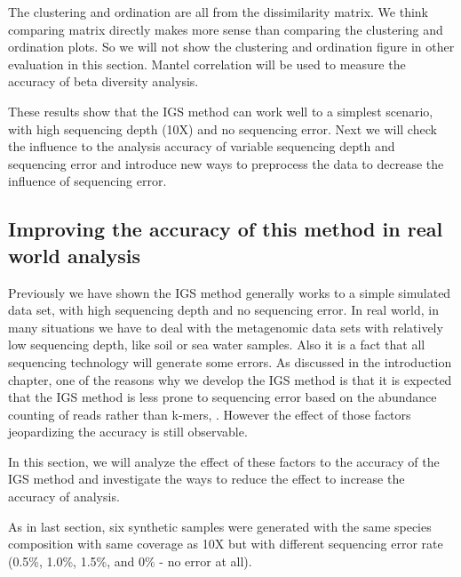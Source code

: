 The clustering and ordination are all from the dissimilarity matrix. 
We think comparing matrix directly makes more sense than comparing the 
clustering and ordination plots. So we will not show the clustering and 
ordination figure in other evaluation in this section. Mantel correlation will 
be used to measure the accuracy of beta diversity analysis.


These results show that the IGS method can work well to a simplest 
scenario, with high sequencing depth (10X) and no sequencing error. Next 
we will check the influence to the analysis accuracy of variable sequencing 
depth and sequencing error and introduce new ways to preprocess the data 
to decrease the influence of sequencing error. 



\subsection{Improving the accuracy of this method in real world analysis}


Previously we have shown the IGS method generally works to a simple simulated
 data set, with high sequencing depth and no sequencing error. In real world,
in many situations we have to deal with the metagenomic data sets with 
relatively low sequencing depth, like soil or sea water samples. 
Also it is a fact that all sequencing technology will generate some errors. As 
discussed in the introduction 
chapter, one of the reasons why we develop the IGS method is that 
it is expected that the IGS 
method is less prone to sequencing error based on the 
abundance counting of reads rather than k-mers, . However the effect of those factors 
jeopardizing the accuracy is still observable. 

In this section, we will analyze the effect of these factors to the accuracy of
 the IGS method and investigate the ways to reduce the effect to increase the 
accuracy of analysis.

As in last section, six synthetic samples were generated with the same species 
composition with same coverage as 10X but with different sequencing error rate (0.5\%,
 1.0\%, 1.5\%, and 0\% - no error at all).
 
